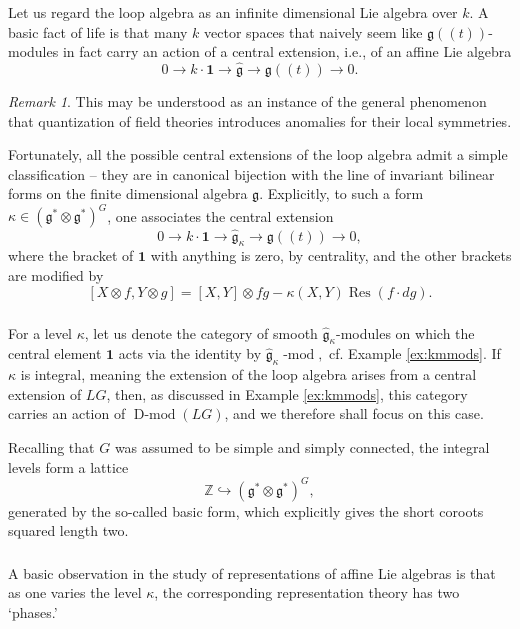 \documentclass[10pt]{amsart}
\newcommand{\fgk}{\widehat{\fg}_\kappa}
\newcommand{\fg}{\mathfrak{g}}
\newcommand{\on}{\operatorname}
\renewcommand{\mod}{\on{-mod}}
\newcommand{\Dmod}{\on{D-mod}}
\theoremstyle{remark}
\newtheorem{re}[subsubsection]{Remark}
\newcommand{\gk}{\widehat{\fg}}
\numberwithin{equation}{section}
\renewcommand{\mod}{\operatorname{-mod}}
\begin{document}
	Let us regard the loop algebra as an infinite dimensional Lie algebra over $k$. A basic fact of life is that many $k$ vector spaces that naively seem like 
	$\fg(\!(t)\!)$-modules in fact carry an action of a central extension, i.e., of an affine Lie algebra
		\[
	0 \rightarrow k \cdot \mathbf{1} \rightarrow \gk \rightarrow 
	\fg(\!(t)\!) \rightarrow 0.
	\]
	
	\begin{re} This may be understood as an instance of the general phenomenon 
	that quantization of field 
	theories introduces anomalies for their local symmetries. \end{re}
	
	Fortunately, all the possible central extensions of the loop algebra admit 
	a simple 
	classification -- they are in canonical bijection with 
	the line of invariant bilinear forms on the finite dimensional algebra 
	$\fg$. 
	Explicitly, to such a form $\kappa \in (\fg^* \otimes \fg^*)^G$, one 
	associates the central extension 
	\[
	 0 \rightarrow k \cdot \mathbf{1} \rightarrow \fgk \rightarrow \fg(\!(t)\!) 
	 \rightarrow 0,
	\]
	where the bracket of $\mathbf{1}$ with anything is zero, by centrality, and 
	the other brackets are modified by 
	\[
	[X \otimes f, Y \otimes g] = [X,Y] \otimes fg - \kappa(X,Y) \on{Res} (f 
	\cdot dg). 
	\]

\subsubsection{} For a level $\kappa$, let us denote the category of smooth 
$\fgk$-modules on 
which the central element $\mathbf{1}$ acts via the identity by 
%
$
  \fgk\mod, 
$
%
cf. Example \ref{ex:kmmods}. If $\kappa$ is integral, meaning the extension of the 
loop algebra arises from a central extension of $LG$, then, 
as discussed in Example \ref{ex:kmmods}, this category carries an action of 
$\Dmod(LG)$, and we therefore shall focus 
on this case. 

Recalling that $G$ was assumed to be simple and simply connected, the integral levels form a 
lattice$$ \mathbb{Z} \hookrightarrow (\fg^* 
\otimes \fg^*)^G,$$generated by the so-called basic form, which explicitly gives the short coroots squared length two. 

\subsubsection{}  A basic observation in the study of representations of 
affine Lie algebras is that as one varies the level $\kappa$, the 
corresponding representation theory has two `phases.'
\end{document}
